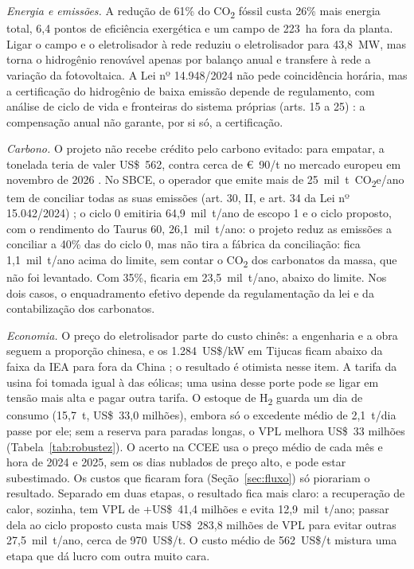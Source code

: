 \documentclass[10pt,a4paper,twocolumn]{article}
\newcommand{\Ht}{H\textsubscript{2}}
\newcommand{\COt}{CO\textsubscript{2}}
\begin{document}
\textit{Energia e emissões.} A redução de 61\% do \COt{} fóssil custa 26\% mais energia total, 6,4 pontos de eficiência exergética e um campo de 223~ha fora da planta. Ligar o campo e o eletrolisador à rede reduziu o eletrolisador para 43,8~MW, mas torna o hidrogênio renovável apenas por balanço anual e transfere à rede a variação da fotovoltaica. A Lei nº 14.948/2024 não pede coincidência horária, mas a certificação do hidrogênio de baixa emissão depende de regulamento, com análise de ciclo de vida e fronteiras do sistema próprias (arts. 15 a 25) \cite{lei14948}: a compensação anual não garante, por si só, a certificação.

\textit{Carbono.} O projeto não recebe crédito pelo carbono evitado: para empatar, a tonelada teria de valer US\$~562, contra cerca de €~90/t no mercado europeu em novembro de 2026 \cite{yermolenko2026}. No SBCE, o operador que emite mais de 25~mil~t~\COt{}e/ano tem de conciliar todas as suas emissões (art. 30, II, e art. 34 da Lei nº 15.042/2024) \cite{lei15042}; o ciclo 0 emitiria 64,9~mil~t/ano de escopo 1 e o ciclo proposto, com o rendimento do Taurus 60, 26,1~mil~t/ano: o projeto reduz as emissões a conciliar a 40\% das do ciclo 0, mas não tira a fábrica da conciliação: fica 1,1~mil~t/ano acima do limite, sem contar o \COt{} dos carbonatos da massa, que não foi levantado. Com 35\%, ficaria em 23,5~mil~t/ano, abaixo do limite. Nos dois casos, o enquadramento efetivo depende da regulamentação da lei e da contabilização dos carbonatos.

\textit{Economia.} O preço do eletrolisador parte do custo chinês: a engenharia e a obra seguem a proporção chinesa, e os 1.284~US\$/kW em Tijucas ficam abaixo da faixa da IEA para fora da China \cite{iea2025a}; o resultado é otimista nesse item. A tarifa da usina foi tomada igual à das eólicas; uma usina desse porte pode se ligar em tensão mais alta e pagar outra tarifa. O estoque de \Ht{} guarda um dia de consumo (15,7~t, US\$~33,0 milhões), embora só o excedente médio de 2,1~t/dia passe por ele; sem a reserva para paradas longas, o VPL melhora US\$~33 milhões (Tabela~\ref{tab:robustez}). O acerto na CCEE usa o preço médio de cada mês e hora de 2024 e 2025, sem os dias nublados de preço alto, e pode estar subestimado. Os custos que ficaram fora (Seção~\ref{sec:fluxo}) só piorariam o resultado. Separado em duas etapas, o resultado fica mais claro: a recuperação de calor, sozinha, tem VPL de +US\$~41,4 milhões e evita 12,9~mil~t/ano; passar dela ao ciclo proposto custa mais US\$~283,8 milhões de VPL para evitar outras 27,5~mil~t/ano, cerca de 970~US\$/t. O custo médio de 562~US\$/t mistura uma etapa que dá lucro com outra muito cara.
\end{document}
